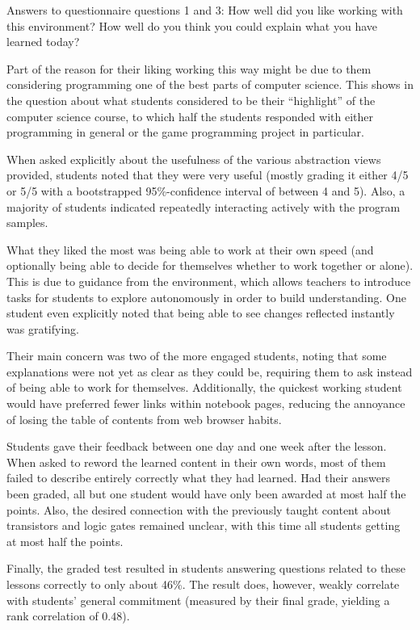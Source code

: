 \begin{cfigure}{Answers to questionnaire questions 1 and 3: How well did you like working with this environment? How well do you think you could explain what you have learned today?}

\end{cfigure}

Part of the reason for their liking working this way might be due to them considering programming one of the best parts of computer science. This shows in the question about what students considered to be their ``highlight'' of the computer science course, to which half the students responded with either programming in general or the game programming project in particular.

When asked explicitly about the usefulness of the various abstraction views provided, students noted that they were very useful (mostly grading it either 4/5 or 5/5 with a bootstrapped 95\%-confidence interval of between 4 and 5). Also, a majority of students indicated repeatedly interacting actively with the program samples.

What they liked the most was being able to work at their own speed (and optionally being able to decide for themselves whether to work together or alone). This is due to guidance from the environment, which allows teachers to introduce tasks for students to explore autonomously in order to build understanding. One student even explicitly noted that being able to see changes reflected instantly was gratifying.

Their main concern was two of the more engaged students, noting that some explanations were not yet as clear as they could be, requiring them to ask instead of being able to work for themselves. Additionally, the quickest working student would have preferred fewer links within notebook pages, reducing the annoyance of losing the table of contents from web browser habits.

Students gave their feedback between one day and one week after the lesson. When asked to reword the learned content in their own words, most of them failed to describe entirely correctly what they had learned. Had their answers been graded, all but one student would have only been awarded at most half the points. Also, the desired connection with the previously taught content about transistors and logic gates remained unclear, with this time all students getting at most half the points.

Finally, the graded test resulted in students answering questions related to these lessons correctly to only about 46\%. The result does, however, weakly correlate with students' general commitment (measured by their final grade, yielding a rank correlation of $0.48$).



